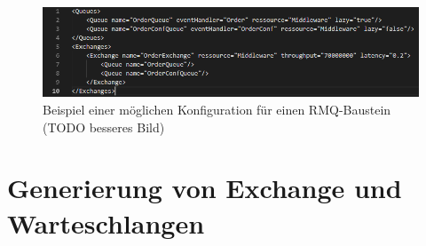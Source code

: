 \begin{figure}
\center
  \includegraphics[width=1\textwidth]{code/configExample.png}
  \caption{Beispiel einer möglichen Konfiguration für einen RMQ-Baustein (TODO besseres Bild)}
  \label{img:configExample}
\end{figure}

\section{Generierung von Exchange und Warteschlangen}
